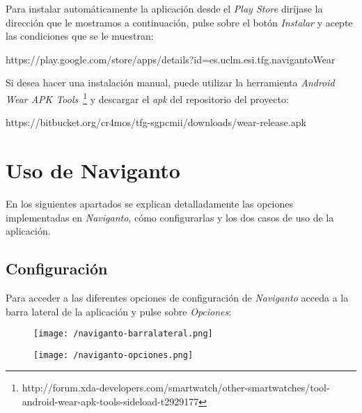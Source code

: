 Para instalar automáticamente la aplicación desde el \emph{Play Store} diríjase la dirección que le
mostramos a continuación, pulse sobre el botón \emph{Instalar} y acepte las condiciones que se le
muestran:

\begin{listing}
https://play.google.com/store/apps/details?id=es.uclm.esi.tfg.navigantoWear
\end{listing}

Si desea hacer una instalación manual, puede utilizar la herramienta \emph{Android Wear APK
  Tools}~\footnote{http://forum.xda-developers.com/smartwatch/other-smartwatches/tool-android-wear-apk-tools-sideload-t2929177}
y descargar el \emph{apk} del repositorio del proyecto:

\begin{listing}
https://bitbucket.org/cr4mos/tfg-sgpcmii/downloads/wear-release.apk
\end{listing}

\section{Uso de Naviganto}

En los siguientes apartados se explican detalladamente las opciones implementadas en
\emph{Naviganto}, cómo configurarlas y los dos casos de uso de la aplicación.

\subsection{Configuración}

Para acceder a las diferentes opciones de configuración de \emph{Naviganto} acceda a la barra
lateral de la aplicación y pulse sobre \emph{Opciones}:

\begin{figure}[h]
  \begin{minipage}[b]{0.5\linewidth}
    \begin{center}
      \texttt{[image: /naviganto-barralateral.png]}
    \end{center}
  \end{minipage}
  \begin{minipage}[b]{0.5\linewidth}
    \begin{center}
      \texttt{[image: /naviganto-opciones.png]}
    \end{center}
  \end{minipage}
\end{figure}

